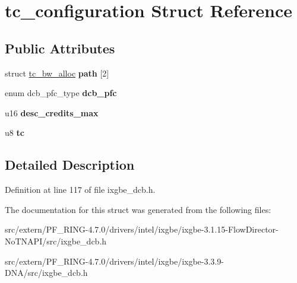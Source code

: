 \hypertarget{structtc__configuration}{
\section{tc\_\-configuration Struct Reference}
\label{structtc__configuration}
}
\subsection*{Public Attributes}
\begin{DoxyCompactItemize}
\item 
\hypertarget{structtc__configuration_a119b56b58334fd73e359865e235daeef}{
struct \hyperlink{structtc__bw__alloc}{tc\_\-bw\_\-alloc} {\bfseries path} \mbox{[}2\mbox{]}}
\label{structtc__configuration_a119b56b58334fd73e359865e235daeef}

\item 
\hypertarget{structtc__configuration_a7feacbc86d9e63019e1fa28534417552}{
enum dcb\_\-pfc\_\-type {\bfseries dcb\_\-pfc}}
\label{structtc__configuration_a7feacbc86d9e63019e1fa28534417552}

\item 
\hypertarget{structtc__configuration_a546d2ed19c2ac7117f37303d84cb7549}{
u16 {\bfseries desc\_\-credits\_\-max}}
\label{structtc__configuration_a546d2ed19c2ac7117f37303d84cb7549}

\item 
\hypertarget{structtc__configuration_ae8e8f3e6cb2356e99d631da8fb13cfe6}{
u8 {\bfseries tc}}
\label{structtc__configuration_ae8e8f3e6cb2356e99d631da8fb13cfe6}

\end{DoxyCompactItemize}


\subsection{Detailed Description}


Definition at line 117 of file ixgbe\_\-dcb.h.



The documentation for this struct was generated from the following files:\begin{DoxyCompactItemize}
\item 
src/extern/PF\_\-RING-\/4.7.0/drivers/intel/ixgbe/ixgbe-\/3.1.15-\/FlowDirector-\/NoTNAPI/src/ixgbe\_\-dcb.h\item 
src/extern/PF\_\-RING-\/4.7.0/drivers/intel/ixgbe/ixgbe-\/3.3.9-\/DNA/src/ixgbe\_\-dcb.h\end{DoxyCompactItemize}
